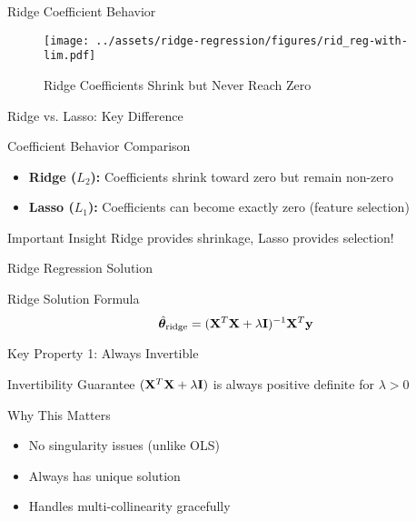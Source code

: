 \documentclass{beamer}
\begin{document}
\begin{frame}{Ridge Coefficient Behavior}
\begin{figure}\texttt{[image: ../assets/ridge-regression/figures/rid\_reg-with-lim.pdf]}\caption{Ridge Coefficients Shrink but Never Reach Zero}
\end{figure}
\end{frame}

\begin{frame}{Ridge vs. Lasso: Key Difference}
\begin{keypointsbox}{Coefficient Behavior Comparison}
\begin{itemize}
\item \textbf{Ridge ($L_2$):} Coefficients shrink toward zero but remain non-zero
\item \textbf{Lasso ($L_1$):} Coefficients can become exactly zero (feature selection)
\end{itemize}
\end{keypointsbox}
\pause

\begin{alertbox}{Important Insight}
Ridge provides shrinkage, Lasso provides selection!
\end{alertbox}
\end{frame}

\begin{frame}{Ridge Regression Solution}
\begin{theorembox}{Ridge Solution Formula}
$$\hat{\boldsymbol{\theta}}_{\text{ridge}} = (\mathbf{X}^T\mathbf{X} + \lambda\mathbf{I})^{-1}\mathbf{X}^T\mathbf{y}$$
\end{theorembox}
\end{frame}

\begin{frame}{Key Property 1: Always Invertible}
\begin{theorembox}{Invertibility Guarantee}
$(\mathbf{X}^T\mathbf{X} + \lambda\mathbf{I})$ is always positive definite for $\lambda > 0$
\end{theorembox}
\pause

\begin{keypointsbox}{Why This Matters}
\begin{itemize}
\item No singularity issues (unlike OLS)
\item Always has unique solution
\item Handles multi-collinearity gracefully
\end{itemize}
\end{keypointsbox}
\end{frame}
\end{document}
